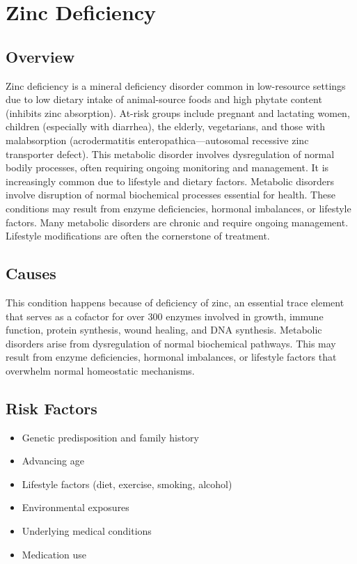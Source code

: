 \chapter{Zinc Deficiency}
\label{sec:Zinc Deficiency}

\section{Overview}
Zinc deficiency is a mineral deficiency disorder common in low-resource settings due to low dietary intake of animal-source foods and high phytate content (inhibits zinc absorption). At-risk groups include pregnant and lactating women, children (especially with diarrhea), the elderly, vegetarians, and those with malabsorption (acrodermatitis enteropathica---autosomal recessive zinc transporter defect). This metabolic disorder involves dysregulation of normal bodily processes, often requiring ongoing monitoring and management. It is increasingly common due to lifestyle and dietary factors. Metabolic disorders involve disruption of normal biochemical processes essential for health. These conditions may result from enzyme deficiencies, hormonal imbalances, or lifestyle factors. Many metabolic disorders are chronic and require ongoing management. Lifestyle modifications are often the cornerstone of treatment.
\section{Causes}
This condition happens because of deficiency of zinc, an essential trace element that serves as a cofactor for over 300 enzymes involved in growth, immune function, protein synthesis, wound healing, and DNA synthesis. Metabolic disorders arise from dysregulation of normal biochemical pathways. This may result from enzyme deficiencies, hormonal imbalances, or lifestyle factors that overwhelm normal homeostatic mechanisms.   
\section{Risk Factors}
\begin{itemize}[noitemsep]
  \item Genetic predisposition and family history
  \item Advancing age
  \item Lifestyle factors (diet, exercise, smoking, alcohol)
  \item Environmental exposures
  \item Underlying medical conditions
  \item Medication use
\end{itemize}
